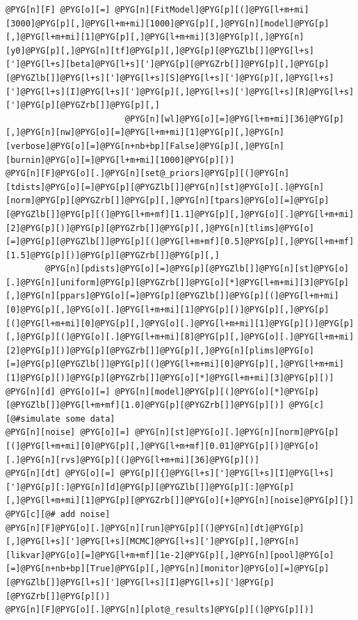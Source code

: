 \documentclass[a4paper,10pt,english]{manual}
\begin{document}
\begin{Verbatim}[commandchars=@\[\]]
@PYG[n][F] @PYG[o][=] @PYG[n][FitModel]@PYG[p][(]@PYG[l+m+mi][3000]@PYG[p][,]@PYG[l+m+mi][1000]@PYG[p][,]@PYG[n][model]@PYG[p][,]@PYG[l+m+mi][1]@PYG[p][,]@PYG[l+m+mi][3]@PYG[p][,]@PYG[n][y0]@PYG[p][,]@PYG[n][tf]@PYG[p][,]@PYG[p][@PYGZlb[]]@PYG[l+s][']@PYG[l+s][beta]@PYG[l+s][']@PYG[p][@PYGZrb[]]@PYG[p][,]@PYG[p][@PYGZlb[]]@PYG[l+s][']@PYG[l+s][S]@PYG[l+s][']@PYG[p][,]@PYG[l+s][']@PYG[l+s][I]@PYG[l+s][']@PYG[p][,]@PYG[l+s][']@PYG[l+s][R]@PYG[l+s][']@PYG[p][@PYGZrb[]]@PYG[p][,]
                        @PYG[n][wl]@PYG[o][=]@PYG[l+m+mi][36]@PYG[p][,]@PYG[n][nw]@PYG[o][=]@PYG[l+m+mi][1]@PYG[p][,]@PYG[n][verbose]@PYG[o][=]@PYG[n+nb+bp][False]@PYG[p][,]@PYG[n][burnin]@PYG[o][=]@PYG[l+m+mi][1000]@PYG[p][)]
@PYG[n][F]@PYG[o][.]@PYG[n][set@_priors]@PYG[p][(]@PYG[n][tdists]@PYG[o][=]@PYG[p][@PYGZlb[]]@PYG[n][st]@PYG[o][.]@PYG[n][norm]@PYG[p][@PYGZrb[]]@PYG[p][,]@PYG[n][tpars]@PYG[o][=]@PYG[p][@PYGZlb[]]@PYG[p][(]@PYG[l+m+mf][1.1]@PYG[p][,]@PYG[o][.]@PYG[l+m+mi][2]@PYG[p][)]@PYG[p][@PYGZrb[]]@PYG[p][,]@PYG[n][tlims]@PYG[o][=]@PYG[p][@PYGZlb[]]@PYG[p][(]@PYG[l+m+mf][0.5]@PYG[p][,]@PYG[l+m+mf][1.5]@PYG[p][)]@PYG[p][@PYGZrb[]]@PYG[p][,]
        @PYG[n][pdists]@PYG[o][=]@PYG[p][@PYGZlb[]]@PYG[n][st]@PYG[o][.]@PYG[n][uniform]@PYG[p][@PYGZrb[]]@PYG[o][*]@PYG[l+m+mi][3]@PYG[p][,]@PYG[n][ppars]@PYG[o][=]@PYG[p][@PYGZlb[]]@PYG[p][(]@PYG[l+m+mi][0]@PYG[p][,]@PYG[o][.]@PYG[l+m+mi][1]@PYG[p][)]@PYG[p][,]@PYG[p][(]@PYG[l+m+mi][0]@PYG[p][,]@PYG[o][.]@PYG[l+m+mi][1]@PYG[p][)]@PYG[p][,]@PYG[p][(]@PYG[o][.]@PYG[l+m+mi][8]@PYG[p][,]@PYG[o][.]@PYG[l+m+mi][2]@PYG[p][)]@PYG[p][@PYGZrb[]]@PYG[p][,]@PYG[n][plims]@PYG[o][=]@PYG[p][@PYGZlb[]]@PYG[p][(]@PYG[l+m+mi][0]@PYG[p][,]@PYG[l+m+mi][1]@PYG[p][)]@PYG[p][@PYGZrb[]]@PYG[o][*]@PYG[l+m+mi][3]@PYG[p][)]
@PYG[n][d] @PYG[o][=] @PYG[n][model]@PYG[p][(]@PYG[o][*]@PYG[p][@PYGZlb[]]@PYG[l+m+mf][1.0]@PYG[p][@PYGZrb[]]@PYG[p][)] @PYG[c][@#simulate some data]
@PYG[n][noise] @PYG[o][=] @PYG[n][st]@PYG[o][.]@PYG[n][norm]@PYG[p][(]@PYG[l+m+mi][0]@PYG[p][,]@PYG[l+m+mf][0.01]@PYG[p][)]@PYG[o][.]@PYG[n][rvs]@PYG[p][(]@PYG[l+m+mi][36]@PYG[p][)]
@PYG[n][dt] @PYG[o][=] @PYG[p][{]@PYG[l+s][']@PYG[l+s][I]@PYG[l+s][']@PYG[p][:]@PYG[n][d]@PYG[p][@PYGZlb[]]@PYG[p][:]@PYG[p][,]@PYG[l+m+mi][1]@PYG[p][@PYGZrb[]]@PYG[o][+]@PYG[n][noise]@PYG[p][}] @PYG[c][@# add noise]
@PYG[n][F]@PYG[o][.]@PYG[n][run]@PYG[p][(]@PYG[n][dt]@PYG[p][,]@PYG[l+s][']@PYG[l+s][MCMC]@PYG[l+s][']@PYG[p][,]@PYG[n][likvar]@PYG[o][=]@PYG[l+m+mf][1e-2]@PYG[p][,]@PYG[n][pool]@PYG[o][=]@PYG[n+nb+bp][True]@PYG[p][,]@PYG[n][monitor]@PYG[o][=]@PYG[p][@PYGZlb[]]@PYG[l+s][']@PYG[l+s][I]@PYG[l+s][']@PYG[p][@PYGZrb[]]@PYG[p][)]
@PYG[n][F]@PYG[o][.]@PYG[n][plot@_results]@PYG[p][(]@PYG[p][)]
\end{Verbatim}
\end{document}
